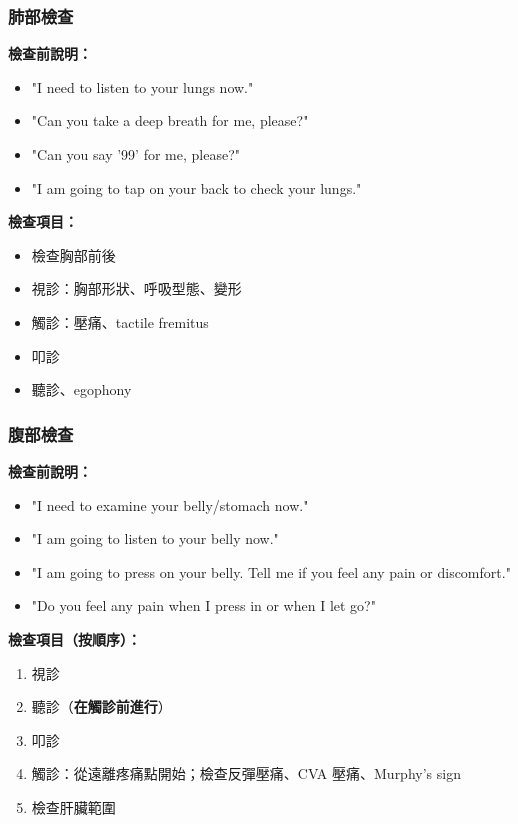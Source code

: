\documentclass[12pt,a4paper]{article}
\begin{document}
\subsubsection{肺部檢查}

\textbf{檢查前說明：}
\begin{itemize}
    \item "I need to listen to your lungs now."
    \item "Can you take a deep breath for me, please?"
    \item "Can you say '99' for me, please?"
    \item "I am going to tap on your back to check your lungs."
\end{itemize}

\textbf{檢查項目：}
\begin{itemize}
    \item 檢查胸部前後
    \item 視診：胸部形狀、呼吸型態、變形
    \item 觸診：壓痛、tactile fremitus
    \item 叩診
    \item 聽診、egophony
\end{itemize}

\subsubsection{腹部檢查}

\textbf{檢查前說明：}
\begin{itemize}
    \item "I need to examine your belly/stomach now."
    \item "I am going to listen to your belly now."
    \item "I am going to press on your belly. Tell me if you feel any pain or discomfort."
    \item "Do you feel any pain when I press in or when I let go?"
\end{itemize}

\textbf{檢查項目（按順序）：}
\begin{enumerate}
    \item 視診
    \item 聽診（\textbf{在觸診前進行}）
    \item 叩診
    \item 觸診：從遠離疼痛點開始；檢查反彈壓痛、CVA 壓痛、Murphy's sign
    \item 檢查肝臟範圍
\end{enumerate}
\end{document}
